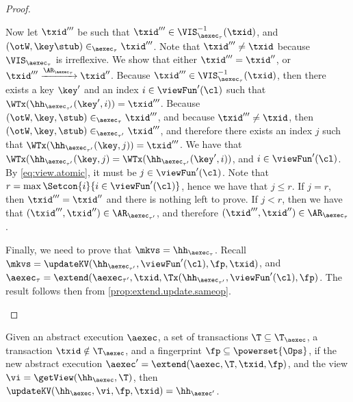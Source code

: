 \begin{proof}
\begin{itemize}
\begin{itemize}
Now let $\txid'''$ be such that $\txid''' \in \VIS^{-1}_{\aexec_{\tau}}(\txid)$, and $(\otW, \key \stub) \in_{\aexec_{\tau}} \txid'''$. 
Note that $\txid''' \neq \txid$ because $\VIS_{\aexec_{\tau}}$ is irreflexive.
We show that either $\txid''' = \txid''$, or $\txid''' \xrightarrow{\AR_{\aexec_{\tau}}} \txid''$. 
Because $\txid''' \in \VIS^{-1}_{\aexec_{\tau}}(\txid)$, then there exists a key $\key'$ and an index $i \in \viewFun'(\cl)$ 
such that $\WTx(\hh_{\aexec_{\tau'}}(\key', i)) = \txid'''$. Because $(\otW, \key, \stub) \in_{\aexec_{\tau}} \txid'''$, 
and because $\txid''' \neq \txid$, then $(\otW, \key, \stub) \in_{\aexec_{\tau'}} \txid'''$, and therefore there exists 
an index $j$ such that $\WTx(\hh_{\aexec_{\tau'}}(\key, j)) = \txid'''$. We have that $\WTx(\hh_{\aexec_{\tau'}}(\key, j) = 
\WTx(\hh_{\aexec_{\tau'}}(\key', i))$, and $i \in \viewFun'(\cl)$. By \cref{eq:view.atomic}, it must be $j \in \viewFun'(\cl)$. 
Note that $r = \max\Setcon{i }{ i \in \viewFun'(\cl)}$, hence we have that $j \leq r$. If $j = r$, then $\txid''' = \txid''$ and 
there is nothing left to prove. If $j < r$, then we have that $(\txid''', \txid'') \in \AR_{\aexec_{\tau'}}$, and 
therefore $(\txid''', \txid'') \in \AR_{\aexec_{\tau}}$.
\end{itemize}
Finally, we need to prove that $\mkvs = \hh_{\aexec_{\tau}}$.
Recall $\mkvs = \updateKV(\hh_{\aexec_{\tau'}}, \viewFun'(\cl), \fp, \txid)$, 
and $\aexec_{\tau} = \extend(\aexec_{\tau'}, \txid, \Tx(\hh_{\aexec_{\tau'}}, \viewFun'(\cl), \fp)$. 
The result follows then from \cref{prop:extend.update.sameop}. 
\end{itemize}
\end{proof}


\begin{proposition}
\label{prop:extend.update.sameop}
Given an abstract execution $\aexec$, a set of transactions $\T \subseteq \T_{\aexec}$,
a transaction $\txid \notin \T_{\aexec}$, and a fingerprint $\fp \subseteq \powerset{\Ops}$,
if the new abstract execution $\aexec' = \extend(\aexec, \T, \txid, \fp)$,
and the view $\vi = \getView(\hh_{\aexec}, \T)$,
then $\updateKV(\hh_{\aexec}, \vi, \fp, \txid) = \hh_{\aexec'}$.
\end{proposition}

